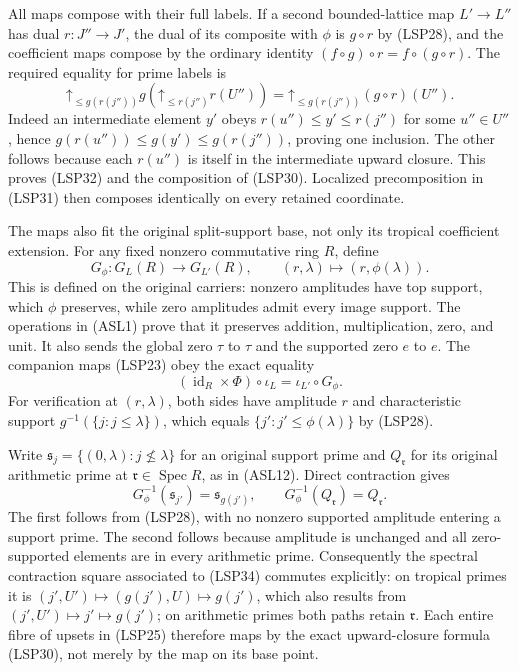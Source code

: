 All maps compose with their full labels. If a second bounded-lattice
map $L'\to L''$ has dual $r:J''\to J'$, the dual of its composite
with $\phi$ is $g\circ r$ by (LSP28), and the coefficient maps
compose by the ordinary identity
$(f\circ g)\circ r=f\circ(g\circ r)$. The required equality for
prime labels is
\begin{equation}\tag{LSP32}
 \mathord{\uparrow}_{\le g(r(j''))}
       g\!\left(\mathord{\uparrow}_{\le r(j'')}r(U'')\right)
 =\mathord{\uparrow}_{\le g(r(j''))}(g\circ r)(U'').
\end{equation}
Indeed an intermediate element $y'$ obeys
$r(u'')\le y'\le r(j'')$ for some $u''\in U''$, hence
$g(r(u''))\le g(y')\le g(r(j''))$, proving one inclusion.
The other follows because each $r(u'')$ is itself in the
intermediate upward closure. This proves (LSP32) and the
composition of (LSP30). Localized precomposition in (LSP31)
then composes identically on every retained coordinate.

The maps also fit the original split-support base, not only its
tropical coefficient extension. For any fixed nonzero commutative
ring $R$, define
\begin{equation}\tag{LSP33}
 G_\phi:G_L(R)\longrightarrow G_{L'}(R),\qquad
 (r,\lambda)\longmapsto(r,\phi(\lambda)).
\end{equation}
This is defined on the original carriers: nonzero amplitudes have
top support, which $\phi$ preserves, while zero amplitudes admit
every image support. The operations in (ASL1) prove that it
preserves addition, multiplication, zero, and unit. It also sends
the global zero $\tau$ to $\tau$ and the supported zero $e$ to
$e$. The companion maps (LSP23) obey the exact equality
\begin{equation}\tag{LSP34}
 (\operatorname{id}_R\times\Phi)\circ\iota_L
       =\iota_{L'}\circ G_\phi.
\end{equation}
For verification at $(r,\lambda)$, both sides have amplitude $r$
and characteristic support $g^{-1}(\{j:j\le\lambda\})$, which
equals $\{j':j'\le\phi(\lambda)\}$ by (LSP28).

Write $\mathfrak s_j=\{(0,\lambda):j\nleq\lambda\}$ for an
original support prime and $Q_{\mathfrak r}$ for its original
arithmetic prime at $\mathfrak r\in\operatorname{Spec}R$, as
in (ASL12). Direct contraction gives
\begin{equation}\tag{LSP35}
 G_\phi^{-1}(\mathfrak s_{j'})=\mathfrak s_{g(j')},
 \qquad G_\phi^{-1}(Q_{\mathfrak r})=Q_{\mathfrak r}.
\end{equation}
The first follows from (LSP28), with no nonzero supported amplitude
entering a support prime. The second follows because amplitude is
unchanged and all zero-supported elements are in every arithmetic
prime. Consequently the spectral contraction square associated
to (LSP34) commutes explicitly: on tropical primes it is
$(j',U')\mapsto(g(j'),U)\mapsto g(j')$, which also results from
$(j',U')\mapsto j'\mapsto g(j')$; on arithmetic primes both
paths retain $\mathfrak r$. Each entire fibre of upsets in (LSP25)
therefore maps by the exact upward-closure formula (LSP30), not
merely by the map on its base point.


